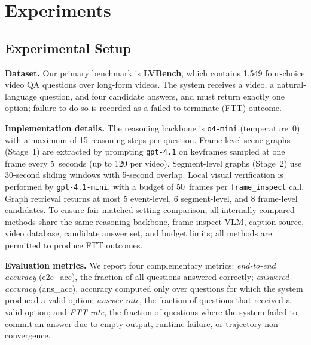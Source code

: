\documentclass[sigconf, screen, review, anonymous]{acmart}
\begin{document}
\section{Experiments}
\label{sec:experiments}


\subsection{Experimental Setup}
\label{sec:setup}

\textbf{Dataset.}
Our primary benchmark is \textbf{LVBench}\cite{lvbench}, which contains
1{,}549 four-choice video QA questions over long-form videos.  The system
receives a video, a natural-language question, and four candidate answers,
and must return exactly one option; failure to do so is recorded as
a failed-to-terminate (FTT) outcome.

\textbf{Implementation details.}
The reasoning backbone is \texttt{o4-mini} (temperature~0) with a maximum
of 15 reasoning steps per question.  Frame-level scene graphs (Stage~1)
are extracted by prompting \texttt{gpt-4.1} on keyframes sampled at one
frame every 5~seconds (up to 120 per video).  Segment-level graphs
(Stage~2) use 30-second sliding windows with 5-second overlap.  Local
visual verification is performed by \texttt{gpt-4.1-mini}, with a budget
of 50~frames per \texttt{frame\_inspect} call.  Graph retrieval returns at
most 5 event-level, 6 segment-level, and 8 frame-level candidates.  To
ensure fair matched-setting comparison, all internally compared methods
share the same reasoning backbone, frame-inspect VLM, caption source,
video database, candidate answer set, and budget limits; all methods are
permitted to produce FTT outcomes.

\textbf{Evaluation metrics.}
We report four complementary metrics: \emph{end-to-end accuracy}
(e2e\_acc), the fraction of all questions answered correctly;
\emph{answered accuracy} (ans\_acc), accuracy computed only over questions
for which the system produced a valid option; \emph{answer rate}, the
fraction of questions that received a valid option; and \emph{FTT rate}, the fraction of questions where the system failed
to commit an answer due to empty output, runtime failure, or trajectory
non-convergence.


\end{document}

